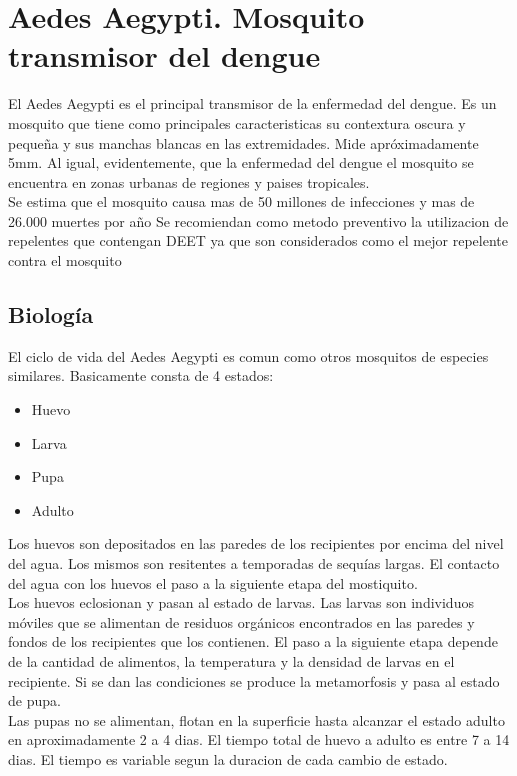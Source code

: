 \section{Aedes Aegypti. Mosquito transmisor del dengue}
El Aedes Aegypti  es el principal transmisor de la enfermedad del dengue. Es un mosquito que tiene como principales caracteristicas su contextura oscura y pequeña y sus manchas blancas en las extremidades. Mide apróximadamente 5mm. Al igual, evidentemente, que la enfermedad del dengue el mosquito se encuentra en zonas urbanas de regiones y paises tropicales.\\

Se estima que el mosquito causa mas de 50 millones de infecciones y mas de 26.000 muertes por año
Se recomiendan como metodo preventivo la utilizacion de repelentes que contengan DEET ya que son considerados como el mejor repelente contra el mosquito\\

\subsection{Biología}

El ciclo de vida del Aedes Aegypti es comun como otros mosquitos de especies similares. Basicamente consta de 4 estados:\\
\begin{itemize}
\item Huevo
\item Larva
\item Pupa
\item Adulto\\
\end{itemize}

Los huevos son depositados en las paredes de los recipientes por encima del nivel del agua. Los mismos son resitentes a temporadas de sequías largas. El contacto del agua con los huevos el paso a la siguiente etapa del mostiquito.\\

Los huevos eclosionan y pasan al estado de larvas. Las larvas son individuos móviles que se alimentan de residuos orgánicos encontrados en las paredes y fondos de los recipientes que los contienen. El paso a la siguiente etapa depende de la cantidad de alimentos, la temperatura y la densidad de larvas en el recipiente. Si se dan las condiciones se produce la metamorfosis y pasa al estado de pupa.\\

Las pupas no se alimentan, flotan en la superficie hasta alcanzar el estado adulto en aproximadamente 2 a 4 dias. El tiempo total de huevo a adulto es entre 7 a 14 dias. El tiempo es variable segun la duracion de cada cambio de estado.\\

